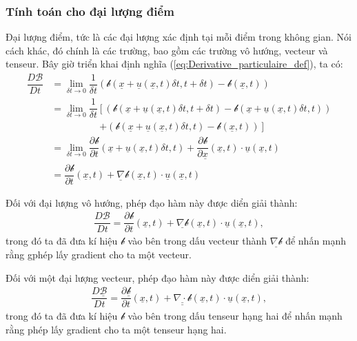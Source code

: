 \documentclass[../../../main.tex]{subfiles}
\begin{document}
	\subsubsection{Tính toán cho đại lượng điểm}
		Đại lượng điểm, tức là các đại lượng xác định tại mỗi điểm trong không gian. Nói cách khác, đó chính là các trường, bao gồm các trường vô hướng, vecteur và tenseur. Bây giờ triển khai định nghĩa (\ref{eq:Derivative_particulaire_def}), ta có:
			\[
				\begin{aligned}
					\dfrac{D\mathscr{B}}{Dt}&=\lim\limits _{\delta t\rightarrow0}\dfrac{1}{\delta t}\left(\mathscr{b}\left(\underline{x}+\underline{u}\left(\underline{x},t\right)\delta t,t+\delta t\right)-\mathscr{b}\left(\underline{x},t\right)\right)\\
					&=\lim\limits_{\delta t\rightarrow0}\dfrac{1}{\delta t}\left[\left(\mathscr{b}\left(\underline{x}+\underline{u}\left(\underline{x},t\right)\delta t,t+\delta t\right)-\mathscr{b}\left(\underline{x}+\underline{u}\left(\underline{x},t\right)\delta t,t\right)\right)\right.\\
					&\qquad\qquad\quad\left.+\left(\mathscr{b}\left(\underline{x}+\underline{u}\left(\underline{x},t\right)\delta t,t\right)-\mathscr{b}\left(\underline{x},t\right)\right)\right]\\
					&=\lim\limits _{\delta t\rightarrow0}\dfrac{\partial\mathscr{b}}{\partial t}\left(\underline{x}+\underline{u}\left(\underline{x},t\right)\delta t,t\right)+\dfrac{\partial\mathscr{b}}{\partial\underline{x}}\left(\underline{x},t\right)\cdot\underline{u}\left(\underline{x},t\right)\\
					&=\dfrac{\partial\mathscr{b}}{\partial t}\left(\underline{x},t\right)+\underline{\nabla}\mathscr{b}\left(\underline{x},t\right)\cdot\underline{u}\left(\underline{x},t\right)
				\end{aligned}
			\]

		Đối với đại lượng vô hướng, phép đạo hàm này được diển giải thành:
			\begin{align}
				\boxed{\dfrac{D\mathscr{B}}{Dt}=\dfrac{\partial\mathscr{b}}{\partial t}\left(\underline{x},t\right)+\underline{\nabla\mathscr{b}}\left(\underline{x},t\right)\cdot\underline{u}\left(\underline{x},t\right)},
			\end{align}
		trong đó ta đã đưa kí hiệu $\mathscr{b}$ vào bên trong dấu vecteur thành $\underline{\nabla\mathscr{b}}$ để nhấn mạnh rằng gphép lấy gradient cho ta một vecteur.

		Đối với một đại lượng vecteur, phép đạo hàm này được diển giải thành:
			\begin{align}
				\boxed{\dfrac{D\underline{\mathscr{B}}}{Dt}=\dfrac{\partial\underline{\mathscr{b}}}{\partial t}\left(\underline{x},t\right)+\underline{\underline{\nabla\cdot\mathscr{b}}}\left(\underline{x},t\right)\cdot\underline{u}\left(\underline{x},t\right)},
			\end{align}
		trong đó ta đã đưa kí hiệu $\mathscr{b}$ vào bên trong dấu tenseur  hạng hai để nhấn mạnh rằng phép lấy gradient cho ta một tenseur hạng hai.
\end{document}
